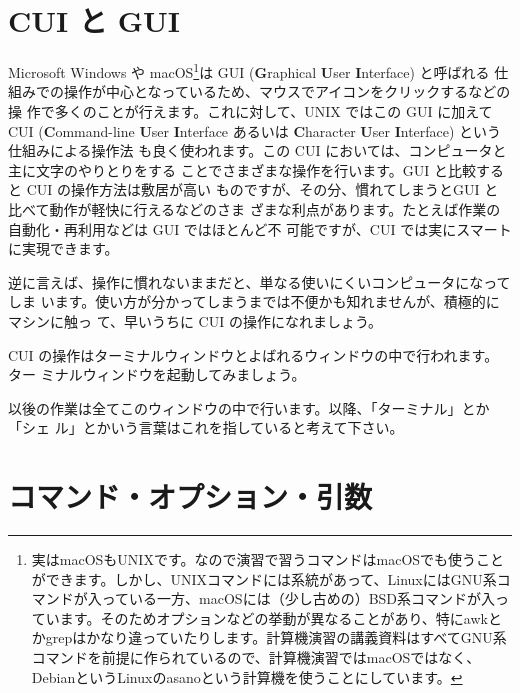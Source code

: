 \documentclass[platex]{jsarticle}
\begin{document}
 \section{CUI と GUI}
 Microsoft Windows や macOS\footnote{ 実はmacOSもUNIXです。なので演習で習うコマンドはmacOSでも使うことができます。しかし、UNIXコマンドには系統があって、LinuxにはGNU系コマンドが入っている一方、macOSには（少し古めの）BSD系コマンドが入っています。そのためオプションなどの挙動が異なることがあり、特にawkとかgrepはかなり違っていたりします。計算機演習の講義資料はすべてGNU系コマンドを前提に作られているので、計算機演習ではmacOSではなく、DebianというLinuxのasanoという計算機を使うことにしています。}は GUI (\textbf{G}raphical \textbf{U}ser \textbf{I}nterface) と呼ばれる
 仕組みでの操作が中心となっているため、マウスでアイコンをクリックするなどの操
 作で多くのことが行えます。これに対して、UNIX ではこの GUI に加えて CUI
 (\textbf{C}ommand-line \textbf{U}ser \textbf{I}nterface あるいは
 \textbf{C}haracter \textbf{U}ser \textbf{I}nterface) という仕組みによる操作法
 も良く使われます。この CUI においては、コンピュータと主に文字のやりとりをする
 ことでさまざまな操作を行います。GUI と比較すると CUI の操作方法は敷居が高い
 ものですが、その分、慣れてしまうとGUI と比べて動作が軽快に行えるなどのさま
 ざまな利点があります。たとえば作業の自動化・再利用などは GUI ではほとんど不
 可能ですが、CUI では実にスマートに実現できます。

 逆に言えば、操作に慣れないままだと、単なる使いにくいコンピュータになってしま
 います。使い方が分かってしまうまでは不便かも知れませんが、積極的にマシンに触っ
 て、早いうちに CUI の操作になれましょう。

 CUI の操作はターミナルウィンドウとよばれるウィンドウの中で行われます。ター
 ミナルウィンドウを起動してみましょう。

 以後の作業は全てこのウィンドウの中で行います。以降、「ターミナル」とか「シェ
 ル」とかいう言葉はこれを指していると考えて下さい。



%


\section{コマンド・オプション・引数}
\end{document}
